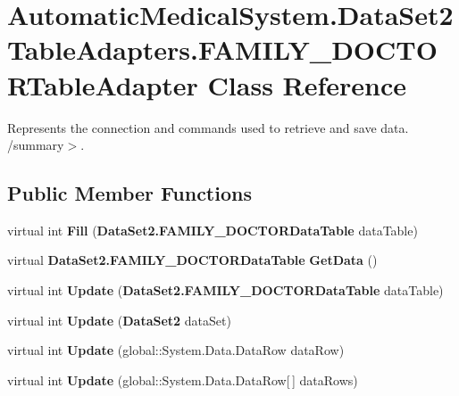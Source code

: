 \section{AutomaticMedicalSystem.DataSet2TableAdapters.FAMILY\_\-DOCTORTableAdapter Class Reference}
\label{class_automatic_medical_system_1_1_data_set2_table_adapters_1_1_f_a_m_i_l_y___d_o_c_t_o_r_table_adapter}
Represents the connection and commands used to retrieve and save data. /summary$>$.  


\subsection*{Public Member Functions}
\begin{CompactItemize}
\item 
virtual int \textbf{Fill} ({\bf DataSet2.FAMILY\_\-DOCTORDataTable} dataTable)\label{class_automatic_medical_system_1_1_data_set2_table_adapters_1_1_f_a_m_i_l_y___d_o_c_t_o_r_table_adapter_f680e23d8ad969e278c65436ecc3506f}

\item 
virtual {\bf DataSet2.FAMILY\_\-DOCTORDataTable} \textbf{GetData} ()\label{class_automatic_medical_system_1_1_data_set2_table_adapters_1_1_f_a_m_i_l_y___d_o_c_t_o_r_table_adapter_940554b6cd527ea2fac8a811db4ee3da}

\item 
virtual int \textbf{Update} ({\bf DataSet2.FAMILY\_\-DOCTORDataTable} dataTable)\label{class_automatic_medical_system_1_1_data_set2_table_adapters_1_1_f_a_m_i_l_y___d_o_c_t_o_r_table_adapter_ad66e406e68f94ac1490b148ecfca52a}

\item 
virtual int \textbf{Update} ({\bf DataSet2} dataSet)\label{class_automatic_medical_system_1_1_data_set2_table_adapters_1_1_f_a_m_i_l_y___d_o_c_t_o_r_table_adapter_87a78f44fd939142d3aae4ee0eccb64b}

\item 
virtual int \textbf{Update} (global::System.Data.DataRow dataRow)\label{class_automatic_medical_system_1_1_data_set2_table_adapters_1_1_f_a_m_i_l_y___d_o_c_t_o_r_table_adapter_1babb742005123ad1e6b1131c4c7ce04}

\item 
virtual int \textbf{Update} (global::System.Data.DataRow[$\,$] dataRows)\label{class_automatic_medical_system_1_1_data_set2_table_adapters_1_1_f_a_m_i_l_y___d_o_c_t_o_r_table_adapter_47ad48e4f81ce5f8b46f0cd015779a9e}


\end{CompactItemize}
